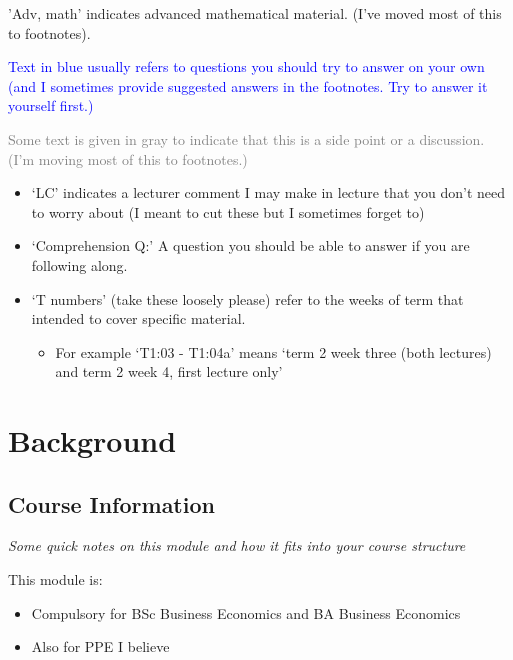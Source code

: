\documentclass[]{article}
\providecommand{\tightlist}{%
  \setlength{\itemsep}{0pt}\setlength{\parskip}{0pt}}
\begin{document}
\textcolor{RawSienna}{'Adv, math'} indicates advanced mathematical
material. (I've moved most of this to footnotes).

\textcolor{blue}{Text in blue usually  refers to questions you should  try to answer on your own (and I sometimes provide suggested answers in the footnotes. Try to answer it yourself first.)}

\textcolor{gray}{Some text is given in gray  to indicate that this is a side point or a discussion. (I'm moving most of this to footnotes.)}

\begin{itemize}
\item
  `LC' indicates a lecturer comment I may make in lecture that you don't
  need to worry about (I meant to cut these but I sometimes forget to)
\item
  `Comprehension Q:' A question you should be able to answer if you are
  following along.
\item
  `T numbers' (take these loosely please) refer to the weeks of term
  that intended to cover specific material.

  \begin{itemize}
  \tightlist
  \item
    For example `T1:03 - T1:04a' means `term 2 week three (both
    lectures) and term 2 week 4, first lecture only'
  \end{itemize}
\end{itemize}

\hypertarget{background}{%
\section{Background}\label{background}}

\hypertarget{course-information}{%
\subsection{Course Information}\label{course-information}}

\emph{Some quick notes on this module and how it fits into your course
structure}

This module is:

\begin{itemize}
\tightlist
\item
  Compulsory for BSc Business Economics and BA Business Economics
\item
  Also for PPE I believe
\end{itemize}
\end{document}
